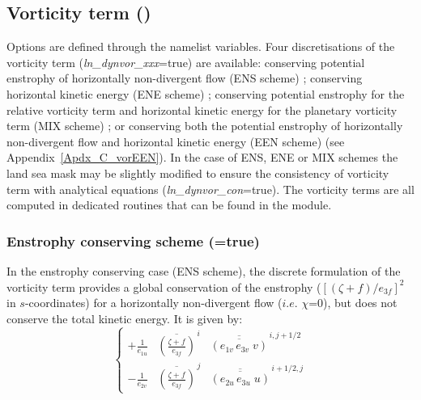 \documentclass[NEMO_book]{subfiles}
\begin{document}
\subsection   [Vorticity term (\textit{dynvor}) ]
			{Vorticity term ()}
\label{DYN_vor}

Options are defined through the  namelist variables.
Four discretisations of the vorticity term (\textit{ln\_dynvor\_xxx}=true) are available: 
conserving potential enstrophy of horizontally non-divergent flow (ENS scheme) ; 
conserving horizontal kinetic energy (ENE scheme) ; conserving potential enstrophy for 
the relative vorticity term and horizontal kinetic energy for the planetary vorticity 
term (MIX scheme) ; or conserving both the potential enstrophy of horizontally non-divergent 
flow and horizontal kinetic energy (EEN scheme) (see  Appendix~\ref{Apdx_C_vorEEN}). In the 
case of ENS, ENE or MIX schemes the land sea mask may be slightly modified to ensure the 
consistency of vorticity term with analytical equations (\textit{ln\_dynvor\_con}=true).
The vorticity terms are all computed in dedicated routines that can be found in 
the  module.

\subsubsection{Enstrophy conserving scheme (=true)}
\label{DYN_vor_ens}

In the enstrophy conserving case (ENS scheme), the discrete formulation of the 
vorticity term provides a global conservation of the enstrophy 
($ [ (\zeta +f ) / e_{3f} ]^2 $ in $s$-coordinates) for a horizontally non-divergent 
flow ($i.e.$ $\chi$=$0$), but does not conserve the total kinetic energy. It is given by:
\begin{equation} \label{Eq_dynvor_ens}
\left\{ 
\begin{aligned}
{+\frac{1}{e_{1u} } } & {\overline {\left( { \frac{\zeta +f}{e_{3f} }} \right)} }^{\,i} 
                                & {\overline{\overline {\left( {e_{1v}\,e_{3v}\;v} \right)}} }^{\,i, j+1/2}    \\
{- \frac{1}{e_{2v} } } & {\overline {\left( {\frac{\zeta +f}{e_{3f} }} \right)} }^{\,j}  
                                & {\overline{\overline {\left( {e_{2u}\,e_{3u}\;u} \right)}} }^{\,i+1/2, j}  
\end{aligned} 
 \right.
\end{equation} 
\end{document}
